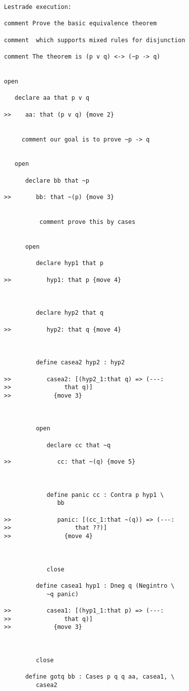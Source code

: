 \documentclass[12pt]{article}
\begin{document}
\begin{verbatim}Lestrade execution:

comment Prove the basic equivalence theorem 

comment  which supports mixed rules for disjunction

comment The theorem is (p v q) <-> (~p -> q)


open

   declare aa that p v q

>>    aa: that (p v q) {move 2}


     comment our goal is to prove ~p -> q


   open

      declare bb that ~p

>>       bb: that ~(p) {move 3}


          comment prove this by cases


      open

         declare hyp1 that p

>>          hyp1: that p {move 4}



         declare hyp2 that q

>>          hyp2: that q {move 4}



         define casea2 hyp2 : hyp2

>>          casea2: [(hyp2_1:that q) => (---:
>>               that q)]
>>            {move 3}



         open

            declare cc that ~q

>>             cc: that ~(q) {move 5}



            define panic cc : Contra p hyp1 \
               bb

>>             panic: [(cc_1:that ~(q)) => (---:
>>                  that ??)]
>>               {move 4}



            close

         define casea1 hyp1 : Dneg q (Negintro \
            ~q panic)

>>          casea1: [(hyp1_1:that p) => (---:
>>               that q)]
>>            {move 3}



         close

      define gotq bb : Cases p q q aa, casea1, \
         casea2


\end{verbatim}
\end{document}
